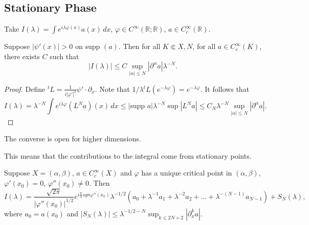 \documentclass[12pt]{scrartcl}
\newcommand{\R}{\mathbb{R}}
\newcommand{\<}{\langle}
\renewcommand{\>}{\rangle}
\let \phi \varphi
\newcommand{\supp}{\text{supp }}
\begin{document}
\subsection{Stationary Phase}
Take $I(\lambda) = \int e^{i\lambda \phi(x)} a(x)\,dx$, $\phi \in C^\infty(\R; \R)$, $a \in C_c^\infty(\R)$.  
\begin{lemma} Suppose $|\psi'(x)| > 0$ on $\supp(a)$.  Then for all $K \Subset X, N$, for all $a \in C_c^\infty(K)$, there exists $C$ such that 
$$|I(\lambda)| \le C \sup_{|\alpha| \le N} |\partial^\alpha a| \lambda^{-N}.$$
\end{lemma}
\begin{proof}
Define ${}^t L = \frac{1}{i|\phi'|^2} \psi' \cdot \partial_x$.  Note that $1/\lambda {}^t L (e^{- \lambda \phi}) = e^{- \lambda \phi}$.  It follows that $$I(\lambda) = \lambda^{-N} \int e^{i \lambda \phi} (L^N a)(x)\,dx \le |\supp a| \lambda^{-N} \sup|L^N a| \le C_N \lambda^{-N} \sup_{|\alpha| \le N} |\partial^\alpha a|.$$
\end{proof}
\begin{remark} The converse is open for higher dimensions.  
\end{remark}
This means that the contributions to the integral come from stationary points.
\begin{theorem} Suppose $X = (\alpha, \beta)$, $a \in C_c^\infty(X)$ and $\phi$ has a unique critical point in $(\alpha, \beta)$, $\phi'(x_0) = 0$, $\phi''(x_0) \ne 0$.  Then $$I(\lambda) = \frac{\sqrt{2\pi}}{|\phi''(x_0)|^{1/2}} e^{i\frac{\pi}{4} sgn \phi''(x_0)} \lambda^{-1/2}(a_0 + \lambda^{-1} a_1 + \lambda^{-2}a_2 + \dots + \lambda^{-(N-1)} a_{N - 1}) + S_N(\lambda),$$
where $a_0 = a(x_0)$ and $|S_N(\lambda)| \le \lambda^{-1/2 - N} \sup_{k \le 2N + 2}|\partial_x^k a|$.
\end{theorem}
\end{document}
